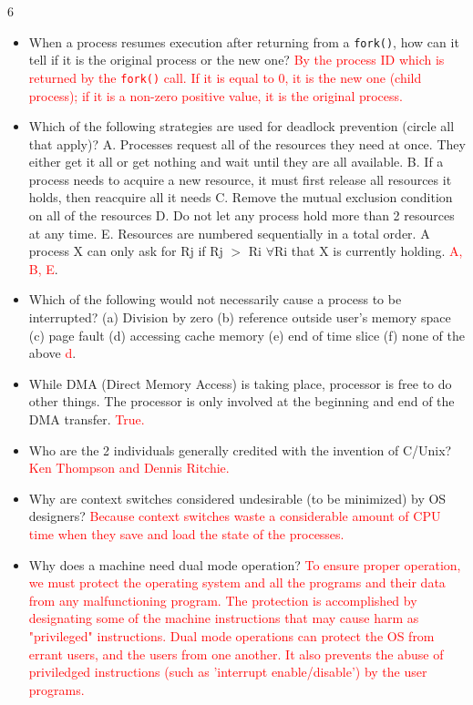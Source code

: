 \documentclass[9pt,landscape]{memoir}
\newcommand{\answer}[1]{\textcolor{red}{#1}}
\begin{document}
\begin{multicols}{6}
\begin{itemize}
    \item When a process resumes execution after returning from a \verb$fork()$, how can it tell if it is the original process or the new one? \answer{By the process ID which is returned by the \texttt{fork()} call. If it is equal to 0, it is the new one (child process); if it is a non-zero positive value, it is the original process.}
    \item Which of the following strategies are used for deadlock prevention (circle all that apply)?  A. Processes request all of the resources they need at once.  They either get it all or get nothing and wait until they are all available.  B. If a process needs to acquire a new resource, it must first release all resources it holds, then reacquire all it needs C. Remove the mutual exclusion condition on all of the resources D. Do not let any process hold more than 2 resources at any time.  E. Resources are numbered sequentially in a total order. A process X can only ask for Rj if Rj $>$ Ri  $\forall$Ri that X is currently holding.  \answer{A, B, E}.
    \item Which of the following would not necessarily cause a process to be interrupted? (a) Division by zero (b) reference outside user's memory space (c) page fault (d) accessing cache memory (e) end of time slice (f) none of the above \answer{d}.
    \item While DMA (Direct Memory Access) is taking place, processor is free to do other things. The processor is only involved at the beginning and end of the DMA transfer.  \answer{True.}
    \item Who are the 2 individuals generally credited with the invention of C/Unix?  \answer{Ken Thompson and Dennis Ritchie.}
    \item Why are context switches considered undesirable (to be minimized) by OS designers?  \answer{Because context switches waste a considerable amount of CPU time when they save and load the state of the processes.}
    \item Why does a machine need dual mode operation? \answer{To ensure proper operation, we must protect the operating system and all the programs and their data from any malfunctioning program.  The protection is accomplished by designating some of the machine instructions that may cause harm as "privileged" instructions.  Dual mode operations can protect the OS from errant users, and the users from one another.  It also prevents the abuse of priviledged instructions (such as 'interrupt enable/disable') by the user programs.}

\end{itemize}
\end{multicols}
\end{document}
